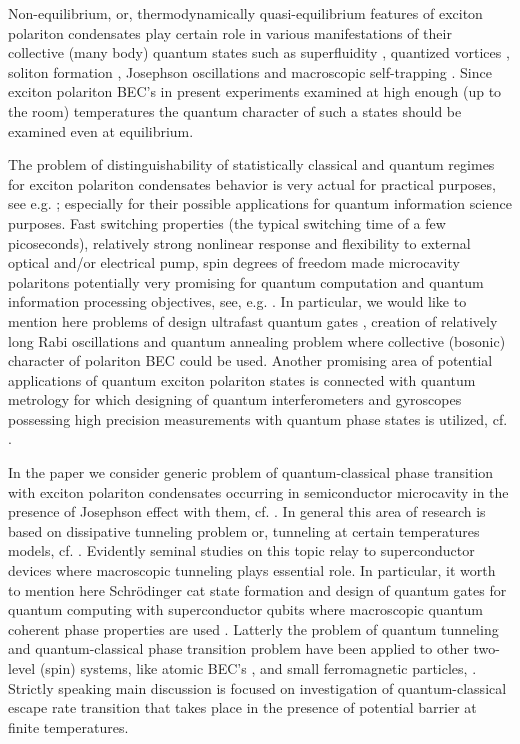 \documentclass[aps, pre, preprint, groupedaddress, superscriptaddress, showkeys, showpacs] {revtex4-1}
\begin{document}
Non-equilibrium, or, thermodynamically quasi-equilibrium features of exciton polariton condensates play certain role in various manifestations of their collective (many body) quantum states such as superfluidity \cite{Carusotto_2013,Amo_2009}, quantized vortices \cite{Lagoudakis_2008,Lagoudakis_2009}, soliton formation \cite{Sich}, Josephson oscillations and macroscopic self-trapping \cite{Abbarchi,Lagoudakis_2010}.
Since exciton polariton BEC's in present experiments examined at high enough (up to the room) temperatures the quantum character of such a states should be examined even at equilibrium.

The problem of distinguishability of statistically classical and quantum regimes for exciton polariton condensates behavior is very actual for practical purposes, see e.g. \cite{Dominici}; especially for their possible applications for quantum information science purposes.
Fast switching properties (the typical switching time of a few picoseconds), relatively strong nonlinear response and flexibility to external optical and/or electrical pump, spin degrees of freedom made microcavity polaritons potentially very promising for quantum computation and quantum information processing objectives, see, e.g. \cite{Demirchyan,Pagel,Kyriienko,Solnyshkov_2015}. In particular, we would like to mention here problems of design ultrafast quantum gates \cite{Kyriienko,Solnyshkov_2015}, creation of relatively long Rabi oscillations \cite{Dominici, Demirchyan} and quantum annealing problem \cite{Yan} where collective (bosonic) character of polariton BEC could be used.
Another promising area of potential applications of quantum exciton polariton states is connected with quantum metrology for which designing of quantum interferometers and gyroscopes possessing high precision measurements with quantum phase states is utilized, cf. \cite{Gulevich, Pezze}.
  
In the paper we consider generic problem of quantum-classical phase transition with exciton polariton condensates occurring in semiconductor microcavity in the presence of Josephson effect with them, cf. \cite{Chudnovsky_1997}.
In general this area of research is based on dissipative tunneling problem or, tunneling at certain temperatures models, cf. \cite{Caldeira,Larkin,Riseborough}.
Evidently seminal studies on this topic relay to superconductor devices \cite{Ankerhold} where macroscopic tunneling plays essential role.
In particular, it worth to mention here Schr\"odinger cat state formation \cite{Leggett} and design of quantum gates for quantum computing with superconductor qubits where macroscopic quantum coherent phase properties are used \cite{Makhlin}.
Latterly the problem of quantum tunneling and quantum-classical phase transition problem have been applied to other two-level (spin) systems, like atomic BEC's \cite{Zhang}, and small ferromagnetic particles, \cite{Owerre}.
Strictly speaking main discussion is focused on investigation of quantum-classical escape rate transition that takes place in the presence of potential barrier at finite temperatures.
  
\end{document}
